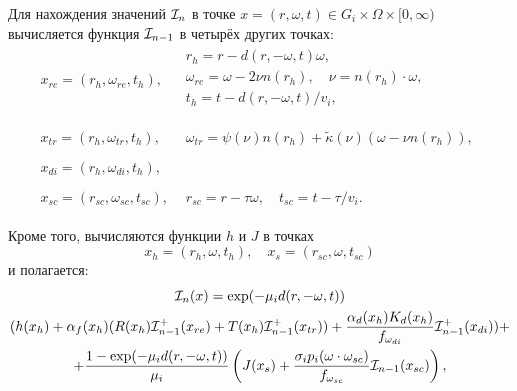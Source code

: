 \documentclass[12pt,reqno]{report}
\begin{document}
Для нахождения значений ${\cal I}_{n}$ в точке
$x=(r,\omega,t)\in G_i \times \Omega \times [0,\infty)$
вычисляется функция ${\cal I}_{n-1}$ в четырёх других точках:
\begin{equation}
\begin{array}{ll}
  x_{re}=(r_h,\omega_{re}, t_h), &
  \begin{array}{l}
    r_h = r - d(r,-\omega,t)\omega,\\
    \omega_{re} = \omega - 2\nu n(r_h),  \quad  \nu=n(r_h) \cdot \omega,\\
    t_h = t - d(r,-\omega,t)/v_i, \\
  \end{array}%
\\
\\
  x_{tr}=(r_h,\omega_{tr},t_h), &
  \begin{array}{l}
    \omega_{tr}=\psi (\nu)
    n(r_h) + \widetilde{\kappa}(\nu)( \omega -  \nu n(r_h)),
  \end{array}
\\
\\
  x_{di}=(r_{h},\omega_{di},t_{h}), &
\\
\\
  x_{sc}=(r_{sc},\omega_{sc},t_{sc}), &
  \begin{array}{l}
    r_{sc}=r-\tau \omega, \quad
    t_{sc}=t-\tau/v_i.
  \end{array}
\end{array}
\end{equation}

Кроме того, вычисляются функции $h$ и $J$ в точках
$$
x_h=(r_h,\omega,t_h),\quad
x_s=(r_{sc},\omega,t_{sc})
$$
и полагается:
\begin{multline}
{\cal I}_n(x) = \exp(-\mu_i d(r, -\omega, t)) 
\\ (h(x_h) +  \alpha_f (x_h)(R(x_h) {\cal I}_{n-1}^+
(x_{re}) + T(x_h) {\cal I}_{n-1}^+ (x_{tr})) + \frac{\alpha_d(x_h) K_d(x_h)} {f_{\omega_{di}}} {\cal I}_{n-1}^+ (x_{di})) +
\\ + \frac{1 - \exp(-\mu_i d(r, -\omega, t))}{\mu_i} \left(J(x_s) + \frac{\sigma_i p_i(\omega \cdot \omega_{sc})} { f_{\omega_{sc}}} {\cal I}_{n-1}(x_{sc})\right),
\end{multline}
\end{document}
